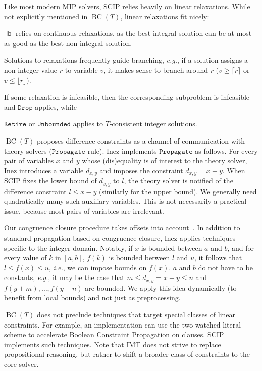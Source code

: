 \documentclass{llncs}
\newcommand{\inez}[0]{\textsf{Inez}}
\newcommand{\ie}[0]{\emph{i.e.}, }
\newcommand{\eg}[0]{\emph{e.g.}, }
\newcommand{\tr}[1]{\ensuremath{\mathtt{#1}}}
\newcommand{\bct}[0]{\ensuremath{\operatorname{BC}(T)}}
\begin{document}
Like most modern MIP solvers, SCIP relies heavily on linear
relaxations. While not explicitly mentioned in \bct{}, linear
relaxations fit nicely:
\begin{inparaenum}[(a)]
\item $\operatorname{\mathsf{lb}}$ relies on continuous relaxations,
  as the best integral solution can be at most as good as the best
  non-integral solution.
\item Solutions to relaxations frequently guide branching, \eg if a
  solution assigns a non-integer value $r$ to variable $v$, it makes
  sense to branch around $r$ ($v \geq \lceil r \rceil$ or $v \leq
  \lfloor r \rfloor$).
\item If some relaxation is infeasible, then the corresponding
  subproblem is infeasible and \tr{Drop} applies, while
\item \tr{Retire} or \tr{Unbounded} applies to $T$-consistent integer
  solutions.
\end{inparaenum}

\bct{} proposes difference constraints as a channel of communication
with theory solvers (\tr{Propagate} rule). \inez{} implements
\tr{Propagate} as follows. For every pair of variables $x$ and $y$
whose (dis)equality is of interest to the theory solver, \inez{}
introduces a variable $d_{x,y}$ and imposes the constraint $d_{x,y} =
x - y$. When SCIP fixes the lower bound of $d_{x,y}$ to $l$, the
theory solver is notified of the difference constraint $l \leq x - y$
(similarly for the upper bound). We generally need quadratically many
such auxiliary variables. This is not necessarily a practical issue,
because most pairs of variables are irrelevant.

Our congruence closure procedure takes offsets into
account~\cite{ccoffsets}. In addition to standard propagation based on
congruence closure, \inez{} applies techniques specific to the integer
domain. Notably, if $x$ is bounded between $a$ and $b$, and for every
value of $k$ in $[a, b]$, $f(k)$ is bounded between $l$ and $u$, it
follows that $l \leq f(x) \leq u$, \ie we can impose bounds on
$f(x)$. $a$ and $b$ do not have to be constants, \eg it may be the
case that $m \leq d_{x,y} = x - y \leq n$ and $f(y + m), \ldots, f(y +
n)$ are bounded. We apply this idea dynamically (to benefit from local
bounds) and not just as preprocessing.

\bct{} does not preclude techniques that target special classes of
linear constraints. For example, an implementation can use the
two-watched-literal scheme to accelerate Boolean Constraint
Propagation on clauses.  SCIP implements such techniques. Note that
IMT does not strive to replace propositional reasoning, but rather to
shift a broader class of constraints to the core solver.
\end{document}
